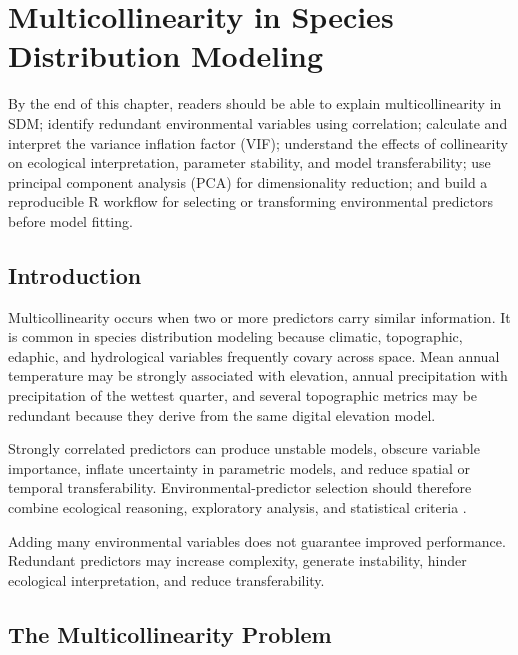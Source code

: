 \chapter[Multicollinearity]{Multicollinearity in Species Distribution Modeling}

\begin{objetivos}
By the end of this chapter, readers should be able to explain multicollinearity
in SDM; identify redundant environmental variables using correlation; calculate
and interpret the variance inflation factor (VIF); understand the effects of
collinearity on ecological interpretation, parameter stability, and model
transferability; use principal component analysis (PCA) for dimensionality
reduction; and build a reproducible R workflow for selecting or transforming
environmental predictors before model fitting.
\end{objetivos}

\section{Introduction}

Multicollinearity occurs when two or more predictors carry similar information.
It is common in species distribution modeling because climatic, topographic,
edaphic, and hydrological variables frequently covary across space. Mean annual
temperature may be strongly associated with elevation, annual precipitation
with precipitation of the wettest quarter, and several topographic metrics may
be redundant because they derive from the same digital elevation model.

Strongly correlated predictors can produce unstable models, obscure variable
importance, inflate uncertainty in parametric models, and reduce spatial or
temporal transferability. Environmental-predictor selection should therefore
combine ecological reasoning, exploratory analysis, and statistical criteria
\parencite{guisan2017habitat,naimi2016sdm,raes2018modeling}.

\begin{atencao}[title={\faExclamationTriangle\quad More predictors do not necessarily produce a better model}]
Adding many environmental variables does not guarantee improved performance.
Redundant predictors may increase complexity, generate instability, hinder
ecological interpretation, and reduce transferability.
\end{atencao}

\section{The Multicollinearity Problem}

